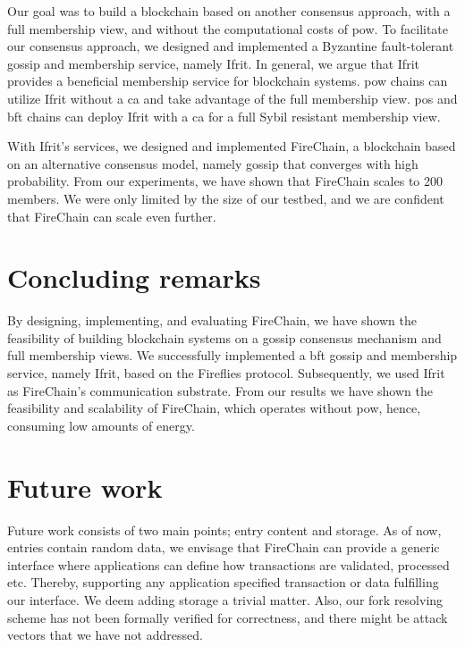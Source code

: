 \documentclass[USenglish]{uit-thesis}
\begin{document}
Our goal was to build a blockchain based on another consensus approach, with a full membership view, and without the computational costs of \gls{pow}.
To facilitate our consensus approach, we designed and implemented a Byzantine fault-tolerant gossip and membership service, namely Ifrit.
In general, we argue that Ifrit provides a beneficial membership service for blockchain systems.
\gls{pow} chains can utilize Ifrit without a \gls{ca} and take advantage of the full membership view.
\gls{pos} and \gls{bft} chains can deploy Ifrit with a \gls{ca} for a full Sybil resistant membership view.

With Ifrit's services, we designed and implemented FireChain, a blockchain based on an alternative consensus model, namely gossip that converges with high probability.
From our experiments, we have shown that FireChain scales to 200 members. 
We were only limited by the size of our testbed, and we are confident that FireChain can scale even further.




\section{Concluding remarks}
\iffalse
Our thesis was that:
\begin{quote}
	\textit{An efficient and scalable blockchain can be built using a byzantine fault-tolerant gossip service.}
\end{quote}
\fi
By designing, implementing, and evaluating FireChain, we have shown the feasibility of building blockchain systems on a gossip consensus mechanism and full membership views.
We successfully implemented a \gls{bft} gossip and membership service, namely Ifrit, based on the Fireflies protocol. 
Subsequently, we used Ifrit as FireChain's communication substrate.
From our results we have shown the feasibility and scalability of FireChain, which operates without \gls{pow}, hence, consuming low amounts of energy.


\section{Future work}
Future work consists of two main points; entry content and storage.
As of now, entries contain random data, we envisage that FireChain can provide a generic interface where applications can define how transactions are validated, processed etc.
Thereby, supporting any application specified transaction or data fulfilling our interface.
We deem adding storage a trivial matter.
Also, our fork resolving scheme has not been formally verified for correctness, and there might be attack vectors that we have not addressed.
\end{document}
